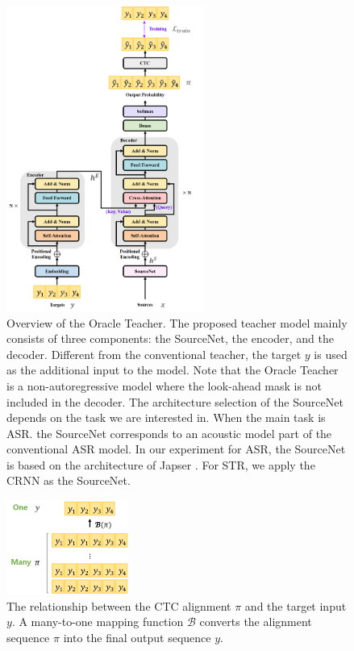 \documentclass[journal]{IEEEtran}
\begin{document}
\begin{figure}[t]
\centering
	\includegraphics[height=10cm]{overview3.png}
	\caption{Overview of the Oracle Teacher. The proposed teacher model mainly consists of three components: the SourceNet, the encoder, and the decoder. Different from the conventional teacher, the target $y$ is used as the additional input to the model. Note that the Oracle Teacher is a non-autoregressive model where the look-ahead mask is not included in the decoder. The architecture selection of the SourceNet depends on the task we are interested in. When the main task is ASR. the SourceNet corresponds to an acoustic model part of the conventional ASR model. In our experiment for ASR, the SourceNet is based on the architecture of Japser \cite{jasper:scheme}. For STR, we apply the CRNN \cite{crnn:scheme} as the SourceNet.}
	\label{oracle_arc}
\end{figure}

\begin{figure}[t]
    \centering
    \includegraphics[height=3.1cm]{manytoone.png}
    \caption{The relationship between the CTC alignment $\pi$ and the target input $y$. A many-to-one mapping function $\mathcal{B}$ converts the alignment sequence $\pi$ into the final output sequence $y$.}
    \label{CTC_MANY}
\end{figure}
\end{document}
